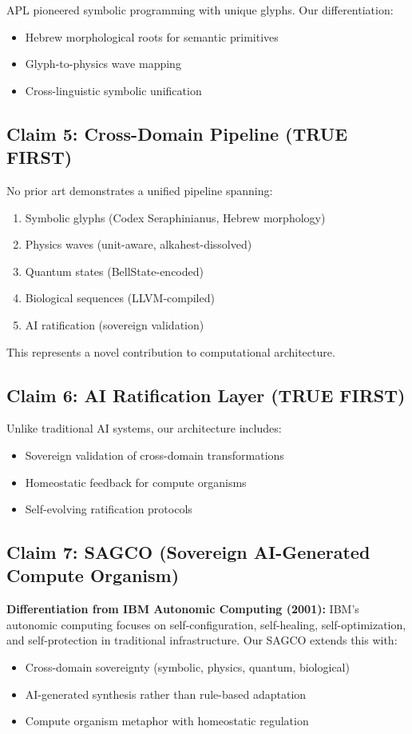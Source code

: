 \documentclass[11pt,a4paper]{article}
\begin{document}
APL \cite{apl} pioneered symbolic programming with unique glyphs. Our differentiation:
\begin{itemize}
    \item Hebrew morphological roots for semantic primitives
    \item Glyph-to-physics wave mapping
    \item Cross-linguistic symbolic unification
\end{itemize}

\subsection{Claim 5: Cross-Domain Pipeline (TRUE FIRST)}

No prior art demonstrates a unified pipeline spanning:
\begin{enumerate}
    \item Symbolic glyphs (Codex Seraphinianus, Hebrew morphology)
    \item Physics waves (unit-aware, alkahest-dissolved)
    \item Quantum states (BellState-encoded)
    \item Biological sequences (LLVM-compiled)
    \item AI ratification (sovereign validation)
\end{enumerate}

This represents a novel contribution to computational architecture.

\subsection{Claim 6: AI Ratification Layer (TRUE FIRST)}

Unlike traditional AI systems, our architecture includes:
\begin{itemize}
    \item Sovereign validation of cross-domain transformations
    \item Homeostatic feedback for compute organisms
    \item Self-evolving ratification protocols
\end{itemize}

\subsection{Claim 7: SAGCO (Sovereign AI-Generated Compute Organism)}

\textbf{Differentiation from IBM Autonomic Computing (2001):} IBM's autonomic computing \cite{autonomic} focuses on self-configuration, self-healing, self-optimization, and self-protection in traditional infrastructure. Our SAGCO extends this with:
\begin{itemize}
    \item Cross-domain sovereignty (symbolic, physics, quantum, biological)
    \item AI-generated synthesis rather than rule-based adaptation
    \item Compute organism metaphor with homeostatic regulation
\end{itemize}
\end{document}
